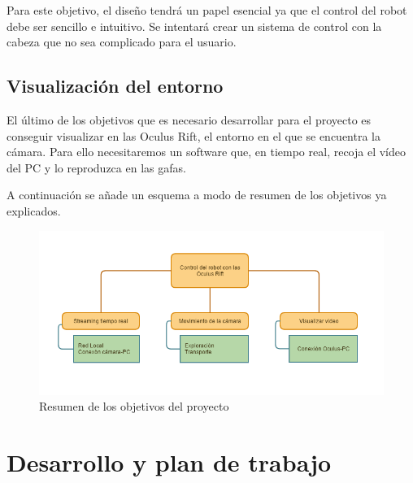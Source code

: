 \documentclass[twoside, 11pt]{epstfg}
\begin{document}
Para este objetivo, el diseño tendrá un papel esencial ya que el control del robot debe ser sencillo e intuitivo. Se intentará crear un sistema de control con la cabeza que no sea complicado para el usuario.

\subsection{Visualización del entorno}
El último de los objetivos que es necesario desarrollar para el proyecto es conseguir visualizar en las Oculus Rift, el entorno en el que se encuentra la cámara.
Para ello necesitaremos un software que, en tiempo real, recoja el vídeo del PC y lo reproduzca en las gafas. 

A continuación se añade un esquema a modo de resumen de los objetivos ya explicados.

\begin{figure}[h!]
	\centerline{
		\mbox{\includegraphics[width=7.00in]{images/objetivos.png}}
	}
	\caption{Resumen de los objetivos del proyecto}
\end{figure}


\newpage
\section{Desarrollo y plan de trabajo}
\end{document}
